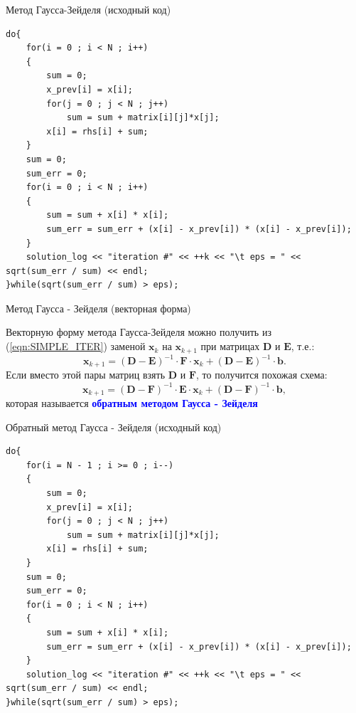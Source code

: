 \documentclass[10pt,xcolor=pst,aspectratio=169]{beamer}
\begin{document}
\begin{frame}[fragile]{Метод Гаусса-Зейделя (исходный код)}

	\transdissolve[duration=0.2]
	\begin{lstlisting}
do{
    for(i = 0 ; i < N ; i++)
    {
        sum = 0;
        x_prev[i] = x[i];
        for(j = 0 ; j < N ; j++)
            sum = sum + matrix[i][j]*x[j];
        x[i] = rhs[i] + sum;
    }
    sum = 0;
    sum_err = 0;
    for(i = 0 ; i < N ; i++)
    {
        sum = sum + x[i] * x[i];
        sum_err = sum_err + (x[i] - x_prev[i]) * (x[i] - x_prev[i]);
    }
    solution_log << "iteration #" << ++k << "\t eps = " << sqrt(sum_err / sum) << endl;
}while(sqrt(sum_err / sum) > eps);
	\end{lstlisting}

\end{frame}

\begin{frame}{Метод Гаусса - Зейделя (векторная форма)}

	\transdissolve[duration=0.2]
	\justifying
	\large
	Векторную форму метода Гаусса-Зейделя можно получить из (\ref{eqn:SIMPLE_ITER}) заменой $\textbf{x}_{k}$ на $\textbf{x}_{k+1}$ при матрицах $\textbf{D}$ и $\textbf{E}$, т.е.:
	\[
		\textbf{x}_{k+1} = (\textbf{D} - \textbf{E})^{-1} \cdot \textbf{F} \cdot \textbf{x}_{k} + (\textbf{D} - \textbf{E})^{-1} \cdot \textbf{b}.
	\]
	Если вместо этой пары матриц взять $\textbf{D}$ и $\textbf{F}$, то получится похожая схема:
	\[
		\textbf{x}_{k+1} = (\textbf{D} - \textbf{F})^{-1} \cdot \textbf{E} \cdot \textbf{x}_{k} + (\textbf{D} - \textbf{F})^{-1} \cdot \textbf{b},
	\]
которая называется \textbf{\textcolor{blue}{обратным методом Гаусса - Зейделя}}

\end{frame}

\begin{frame}[fragile]{Обратный метод Гаусса - Зейделя (исходный код)}

	\transdissolve[duration=0.2]
	\begin{lstlisting}
do{
    for(i = N - 1 ; i >= 0 ; i--)
    {
        sum = 0;
        x_prev[i] = x[i];
        for(j = 0 ; j < N ; j++)
            sum = sum + matrix[i][j]*x[j];
        x[i] = rhs[i] + sum;
    }
    sum = 0;
    sum_err = 0;
    for(i = 0 ; i < N ; i++)
    {
        sum = sum + x[i] * x[i];
        sum_err = sum_err + (x[i] - x_prev[i]) * (x[i] - x_prev[i]);
    }
    solution_log << "iteration #" << ++k << "\t eps = " << sqrt(sum_err / sum) << endl;
}while(sqrt(sum_err / sum) > eps);
	\end{lstlisting}

\end{frame}
\end{document}
